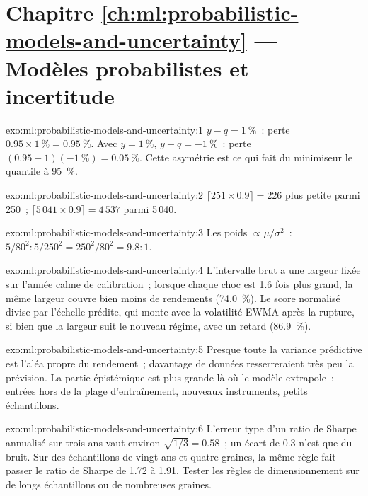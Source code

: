 \section*{Chapitre \ref{ch:ml:probabilistic-models-and-uncertainty} --- Modèles probabilistes et incertitude}

\begin{solution}{exo:ml:probabilistic-models-and-uncertainty:1}
$y - q = 1~\%$~: perte $0.95\times1~\% = 0.95~\%$. Avec $y = 1~\%$, $y - q = -1~\%$~: perte $(0.95 - 1)(-1~\%) = 0.05~\%$. Cette
asymétrie est ce qui fait du minimiseur le quantile à 95~\%.
\end{solution}

\begin{solution}{exo:ml:probabilistic-models-and-uncertainty:2}
$\lceil251\times0.9\rceil = 226$ plus petite parmi 250~; $\lceil5\,041\times0.9\rceil = 4\,537$ parmi 5\,040.
\end{solution}

\begin{solution}{exo:ml:probabilistic-models-and-uncertainty:3}
Les poids $\propto\mu/\sigma^2$~: $5/80^2 : 5/250^2 = 250^2/80^2 = 9.8 : 1$.
\end{solution}

\begin{solution}{exo:ml:probabilistic-models-and-uncertainty:4}
L'intervalle brut a une largeur fixée sur l'année calme de calibration~; lorsque chaque choc est 1.6 fois plus grand, la même largeur
couvre bien moins de rendements (74.0~\%). Le score normalisé divise par l'échelle prédite, qui monte avec la
volatilité EWMA après la rupture, si bien que la largeur suit le nouveau régime, avec un retard (86.9~\%).
\end{solution}

\begin{solution}{exo:ml:probabilistic-models-and-uncertainty:5}
Presque toute la variance prédictive est l'aléa propre du rendement~; davantage de données resserreraient très peu la prévision. La
partie épistémique est plus grande là où le modèle extrapole~: entrées hors de la plage d'entraînement, nouveaux instruments, petits
échantillons.
\end{solution}

\begin{solution}{exo:ml:probabilistic-models-and-uncertainty:6}
L'erreur type d'un ratio de Sharpe annualisé sur trois ans vaut environ $\sqrt{1/3} = 0.58$~; un écart de 0.3 n'est
que du bruit. Sur des échantillons de vingt ans et quatre graines, la même règle fait passer le ratio de Sharpe de 1.72 à 1.91. Tester
les règles de dimensionnement sur de longs échantillons ou de nombreuses graines.
\end{solution}

